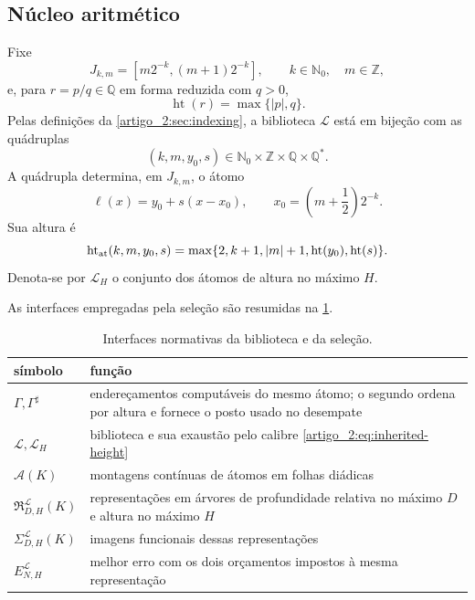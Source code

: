\documentclass[12pt,a4paper]{article}
\theoremstyle{preciso}
\theoremstyle{definition}
\newcommand{\Nzero}{\mathbb{N}_0}
\newcommand{\Qstar}{\mathbb{Q}^{\!*}}
\newcommand{\Aclass}{\mathcal{A}}
\newcommand{\Library}{\mathcal{L}}
\newcommand{\Representations}{\mathfrak{R}}
\newcommand{\height}{\operatorname{ht}}
\theoremstyle{preciso}
\theoremstyle{preciso}
\theoremstyle{preciso}
\theoremstyle{preciso}
\theoremstyle{definition}
\theoremstyle{preciso}
\theoremstyle{definition}
\theoremstyle{preciso}
\theoremstyle{preciso}
\theoremstyle{definition}
\begin{document}
\subsection{Núcleo aritmético}

Fixe
\[
 J_{k,m}=[m2^{-k},(m+1)2^{-k}],
 \qquad k\in\Nzero,\quad m\in\mathbb Z,
\]
e, para $r=p/q\in\mathbb Q$ em forma reduzida com $q>0$,
\[
 \height(r)=\max\{|p|,q\}.
\]
Pelas definições da \cref{artigo_2:sec:indexing}, a biblioteca $\Library$ está em bijeção com as
quádruplas
\[
 (k,m,y_0,s)\in\Nzero\times\mathbb Z\times\mathbb Q\times\Qstar.
\]
A quádrupla determina, em $J_{k,m}$, o átomo
\begin{equation}
 \ell(x)=y_0+s(x-x_0),
 \qquad x_0=\left(m+\frac12\right)2^{-k}.
 \label{artigo_2:eq:inherited-atom}
\end{equation}
Sua altura é
\begin{equation}
 \height_{\rm at}(k,m,y_0,s)
 =\max\{2,k+1,|m|+1,\height(y_0),\height(s)\}.
 \label{artigo_2:eq:inherited-height}
\end{equation}
Denota-se por $\Library_H$ o conjunto dos átomos de altura no máximo $H$.

As interfaces empregadas pela seleção são resumidas na
\cref{artigo_2:tab:interfaces}.
\begin{table}[t]
 \centering
 \caption{Interfaces normativas da biblioteca e da seleção.}
 \label{artigo_2:tab:interfaces}
 \small
 \begin{tabularx}{\linewidth}{@{}lX@{}}
  \toprule
  símbolo & função\\
  \midrule
  $\Gamma,\Gamma^\sharp$ & endereçamentos computáveis do mesmo átomo; o
  segundo ordena por altura e fornece o posto usado no desempate\\
  $\Library,\Library_H$ & biblioteca e sua exaustão pelo calibre
  \eqref{artigo_2:eq:inherited-height}\\
  $\Aclass(K)$ & montagens contínuas de átomos em folhas diádicas\\
  $\Representations_{D,H}^{\Library}(K)$ & representações em árvores de
  profundidade relativa no máximo $D$ e altura no máximo $H$\\
  $\Sigma_{D,H}^{\Library}(K)$ & imagens funcionais dessas representações\\
  $E_{N,H}^{\Library}$ & melhor erro com os dois orçamentos impostos à mesma
  representação\\
  \bottomrule
 \end{tabularx}
\end{table}
\end{document}
